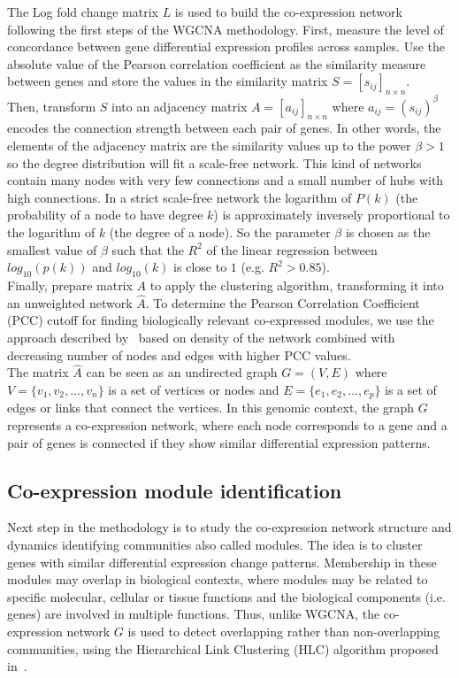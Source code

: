 \documentclass[12pt,journal, onecolumn]{IEEEtran}
\begin{document}
The Log fold change matrix $L$ is used to build the co-expression network following the first steps of the WGCNA methodology. First, measure the level of concordance between gene differential expression profiles across samples. Use the absolute value of the Pearson correlation coefficient as the similarity measure between genes and store the values in the similarity matrix $S=[s_{ij}]_{n\times n}$.\\

Then, transform $S$ into an adjacency matrix $A=[a_{ij}]_{n\times n}$ where $a_{ij} = (s_{ij})^\beta $ encodes the connection strength between each pair of genes. In other words, the elements of the adjacency matrix are the similarity values up to the power $\beta > 1$ so the degree distribution will fit a scale-free network. This kind of networks contain many nodes with very few connections and a small number of hubs with high connections. In a strict scale-free network the logarithm of $P(k)$ (the probability of a node to have degree $k$) is approximately inversely proportional to the logarithm of $k$ (the degree of a node). So the parameter $\beta$ is chosen as the smallest value of $\beta$ such that the $R^2$ of the linear regression between $log_{10}(p(k))$ and $log_{10}(k)$ is close to $1$ (e.g. $R^2 > 0.85$). \\

Finally, prepare matrix $A$ to apply the clustering algorithm, transforming it into an unweighted network $\hat{A}$. To determine the Pearson Correlation Coefficient (PCC) cutoff for finding biologically relevant co-expressed modules, we use the approach described by~\cite{aoki2007approaches} based on density of the network combined with decreasing number of nodes and edges with higher PCC values.\\

The matrix $\hat{A}$ can be seen as an undirected graph $G=(V,E)$ where ${V=\{v_1,v_2,\ldots,v_n\}}$ is a set of vertices or nodes and ${E=\{e_1,e_2,\ldots,e_p\}}$ is a set of edges or links that connect the vertices. In this genomic context, the graph $G$ represents a co-expression network, where each node corresponds to a gene and a pair of genes is connected if they show similar differential expression patterns.

\subsection{Co-expression module identification}

Next step in the methodology is to study the co-expression network structure and dynamics identifying communities also called modules. The idea is to cluster genes with similar differential expression change patterns. Membership in these modules may overlap in biological contexts, where modules may be related to specific molecular, cellular or tissue functions and the biological components (i.e. genes) are involved in multiple functions. Thus, unlike WGCNA, the co-expression network $G$ is used to detect overlapping rather than non-overlapping communities, using the Hierarchical Link Clustering (HLC) algorithm proposed in~\cite{ahn2010link}.\\
\end{document}
